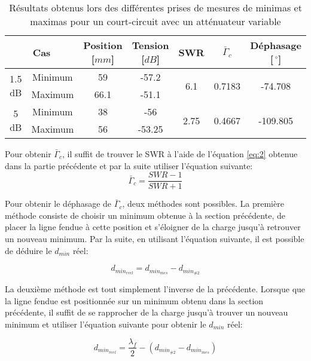 \begin{table}[htbp]
    \centering
    \begin{tabular}{|c|c||c|c|c|c|c|} \hline
    \multicolumn{2}{|c||}{Cas} & Position [$mm$] & Tension [$dB$] & SWR & $\bar{\Gamma}_c$ & Déphasage [$\,^{\circ}$]\\ \hline \hline 
    \multirow{2}{*}{1.5 dB} & Minimum & 59 & -57.2 & \multirow{2}{*}{6.1} & \multirow{2}{*}{0.7183} & \multirow{2}{*}{-74.708}\\ 
 & Maximum & 66.1 & -51.1 & &  & \\ \hline
\multirow{2}{*}{5 dB} & Minimum & 38 & -56 & \multirow{2}{*}{2.75} & \multirow{2}{*}{0.4667} & \multirow{2}{*}{-109.805}\\ 
 & Maximum & 56 & -53.25 & &  & \\ \hline
    \end{tabular}%
        \caption{Résultats obtenus lors des différentes prises de mesures de minimas et maximas pour un court-circuit avec un atténuateur variable}
    \label{tab:3}%
\end{table}%

Pour obtenir $\bar{\Gamma}_c$, il suffit de trouver le SWR à l'aide de l'équation \ref{eq:2} obtenue dans la partie précédente et par la suite utiliser l'équation suivante:
\begin{equation}
    \bar{\Gamma}_c = \frac{SWR - 1}{SWR + 1}
\end{equation}

 Pour obtenir le déphasage de $\bar{\Gamma}_c$, deux méthodes sont possibles. La première méthode consiste de choisir un minimum obtenue à la section précédente, de placer la ligne fendue à cette position et s'éloigner de la charge jusqu'à retrouver un nouveau minimum. Par la suite, en utilisant l'équation suivante, il est possible de déduire le $d_{min}$ réel:

\begin{equation}
    d_{min_{reel}} = d_{min_{mes}} - d_{min_{\#2}} 
\end{equation}

La deuxième méthode est tout simplement l'inverse de la précédente. Lorsque que la ligne fendue est positionnée sur un minimum obtenu dans la section précédente, il suffit de se rapprocher de la charge jusqu'à trouver un nouveau minimum et utiliser l'équation suivante pour obtenir le $d_{min}$ réel:

\begin{equation}
    d_{min_{reel}} = \frac{\lambda_f}{2} - (d_{min_{\#2}} - d_{min_{mes}}) 
\end{equation}

